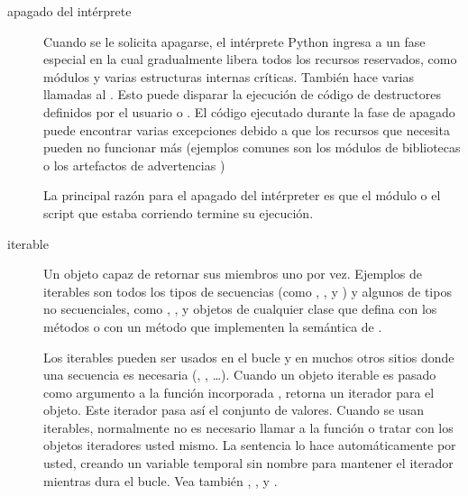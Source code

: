 \documentclass[a4,10pt,spanish]{sphinxmanual}
\begin{document}
\begin{description}
\item[{apagado del intérprete\label{\detokenize{glossary:term-interpreter-shutdown}}}] \leavevmode
\sphinxAtStartPar
Cuando se le solicita apagarse, el intérprete Python ingresa a un fase especial en la cual gradualmente libera todos los recursos reservados, como módulos y varias estructuras internas críticas.  También hace varias llamadas al {\hyperref[\detokenize{glossary:term-garbage-collection}]{}}.  Esto puede disparar la ejecución de código de destructores definidos por el usuario o . El código ejecutado durante la fase de apagado puede encontrar varias excepciones debido a que los recursos que necesita pueden no funcionar más (ejemplos comunes son los módulos de bibliotecas o los artefactos de advertencias )

\sphinxAtStartPar
La principal razón para el apagado del intérpreter es que el módulo  o el script que estaba corriendo termine su ejecución.

\item[{iterable\label{\detokenize{glossary:term-iterable}}}] \leavevmode
\sphinxAtStartPar
Un objeto capaz de retornar sus miembros uno por vez. Ejemplos de iterables son todos los tipos de secuencias (como , , y ) y algunos de tipos no secuenciales, como , {\hyperref[\detokenize{glossary:term-file-object}]{}}, y objetos de cualquier clase que defina con los métodos  o con un método  que implementen la semántica de {\hyperref[\detokenize{glossary:term-sequence}]{}}.

\sphinxAtStartPar
Los iterables pueden ser usados en el bucle  y en muchos otros sitios donde una secuencia es necesaria (, , …).  Cuando un objeto iterable es pasado como argumento a la función incorporada , retorna un iterador para el objeto.  Este iterador pasa así el conjunto de valores.  Cuando se usan iterables, normalmente no es necesario llamar a la función  o tratar con los objetos iteradores usted mismo.  La sentencia  lo hace automáticamente por usted, creando un variable temporal sin nombre para mantener el iterador mientras dura el bucle.  Vea también {\hyperref[\detokenize{glossary:term-iterator}]{}}, {\hyperref[\detokenize{glossary:term-sequence}]{}}, y {\hyperref[\detokenize{glossary:term-generator}]{}}.


\end{description}
\end{document}
